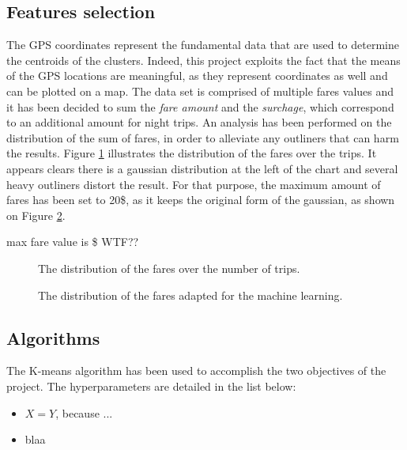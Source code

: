 \documentclass[a4paper]{article}
\begin{document}
\subsection{Features selection}
The GPS coordinates represent the fundamental data that are used to determine the centroids of the clusters. Indeed, this project exploits the fact that the means of the GPS locations are meaningful, as they represent coordinates as well and can be plotted on a map. The data set is comprised of multiple fares values and it has been decided to sum the \emph{fare amount} and the \emph{surchage}, which correspond to an additional amount for night trips. An analysis has been performed on the distribution of the sum of fares, in order to alleviate any outliners that can harm the results. Figure \ref{fig:distribution-fares-bad} illustrates the distribution of the fares over the trips. It appears clears there is a gaussian distribution at the left of the chart and several heavy outliners distort the result. For that purpose, the maximum amount of fares has been set to 20\$, as it keeps the original form of the gaussian, as shown on Figure \ref{fig:distribution-fares-fixed}.

max fare value is \$ WTF?? 

\begin{figure}
  \centering
  \caption{The distribution of the fares over the number of trips.}
  \label{fig:distribution-fares-bad}
\end{figure}

\begin{figure}
  \centering
  \caption{The distribution of the fares adapted for the machine learning.}
  \label{fig:distribution-fares-fixed}
\end{figure}


\subsection{Algorithms}
The K-means algorithm has been used to accomplish the two objectives of the project. The hyperparameters are detailed in the list below:

\begin{itemize}
  \item $X=Y$, because ...
  \item blaa
\end{itemize}
\end{document}
